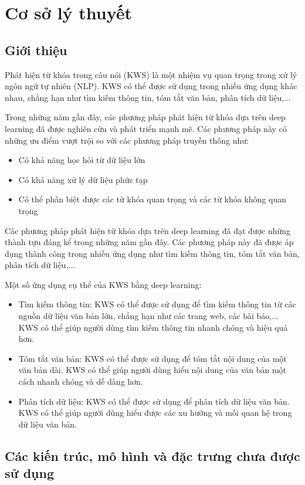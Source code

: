 \chapter{Cơ sở lý thuyết}
\section{Giới thiệu}
Phát hiện từ khóa trong câu nói (KWS) là một nhiệm vụ quan trọng trong xử lý ngôn ngữ tự nhiên (NLP). KWS có thể được sử dụng trong nhiều ứng dụng khác nhau, chẳng hạn như tìm kiếm thông tin, tóm tắt văn bản, phân tích dữ liệu,...

Trong những năm gần đây, các phương pháp phát hiện từ khóa dựa trên deep learning đã được nghiên cứu và phát triển mạnh mẽ. Các phương pháp này có những ưu điểm vượt trội so với các phương pháp truyền thống như:

\begin{itemize}
    \item Có khả năng học hỏi từ dữ liệu lớn
    \item Có khả năng xử lý dữ liệu phức tạp
    \item Có thể phân biệt được các từ khóa quan trọng và các từ khóa không quan trọng
\end{itemize}

Các phương pháp phát hiện từ khóa dựa trên deep learning đã đạt được những thành tựu đáng kể trong những năm gần đây. Các phương pháp này đã được áp dụng thành công trong nhiều ứng dụng như tìm kiếm thông tin, tóm tắt văn bản, phân tích dữ liệu,...

Một số ứng dụng cụ thể của KWS bằng deep learning:
\begin{itemize}
        \item Tìm kiếm thông tin: KWS có thể được sử dụng để tìm kiếm thông tin từ các nguồn dữ liệu văn bản lớn, chẳng hạn như các trang web, các bài báo,... KWS có thể giúp người dùng tìm kiếm thông tin nhanh chóng và hiệu quả hơn.
        \item Tóm tắt văn bản: KWS có thể được sử dụng để tóm tắt nội dung của một văn bản dài. KWS có thể giúp người dùng hiểu nội dung của văn bản một cách nhanh chóng và dễ dàng hơn.
        \item Phân tích dữ liệu: KWS có thể được sử dụng để phân tích dữ liệu văn bản. KWS có thể giúp người dùng hiểu được các xu hướng và mối quan hệ trong dữ liệu văn bản.
\end{itemize}

\section{Các kiến trúc, mô hình và đặc trưng chưa được sử dụng}
